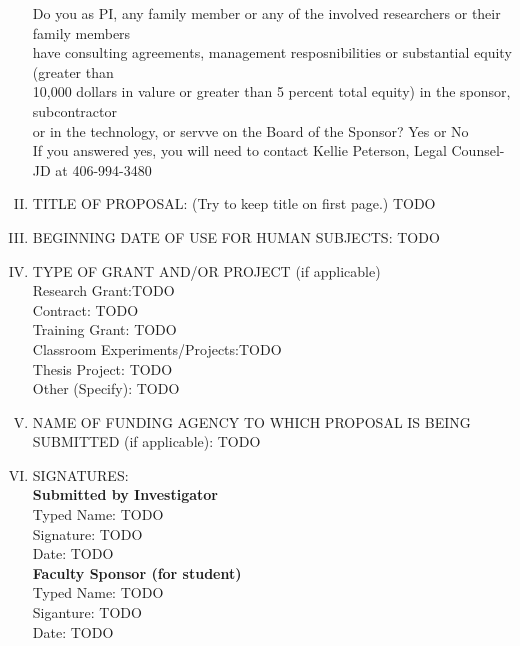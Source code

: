 \documentclass{article}
\newcommand{\response}[1]{{\color{blue}#1}}
\begin{document}
\begin{enumerate}[I.]
        \color{red}
        Do you as PI, any family member or any of the involved researchers or their family members\\
        have consulting agreements, management resposnibilities or substantial equity (greater than\\
        10,000 dollars in valure or greater than 5 percent total equity) in the sponsor, subcontractor\\
        or in the technology, or servve on the Board of the Sponsor? Yes or No\\

        If you answered yes, you will need to contact Kellie Peterson, Legal Counsel-JD at 406-994-3480
        \color{black}


    \item TITLE OF PROPOSAL:  (Try to keep title on first page.)
        \response{TODO}

    \item BEGINNING DATE OF USE FOR HUMAN SUBJECTS: \response{TODO}

    \item TYPE OF GRANT AND/OR PROJECT (if applicable)\\
    Research Grant:\response{TODO} \\
    Contract: \response{TODO} \\
    Training Grant: \response{TODO} \\
    Classroom Experiments/Projects:\response{TODO} \\
    Thesis Project: \response{TODO} \\
    Other (Specify): \response{TODO} \\

    \item NAME OF FUNDING AGENCY TO WHICH PROPOSAL IS BEING SUBMITTED (if applicable): \response{TODO}

    \item SIGNATURES:\\
    \textbf{Submitted by Investigator}\\
    Typed Name: \response{TODO} \\
    Signature: \response{TODO} \\
    Date: \response{TODO} \\
    \textbf{Faculty Sponsor (for student)}\\
    Typed Name: \response{TODO} \\
    Siganture: \response{TODO} \\
    Date: \response{TODO} \\


\end{enumerate}
\end{document}
